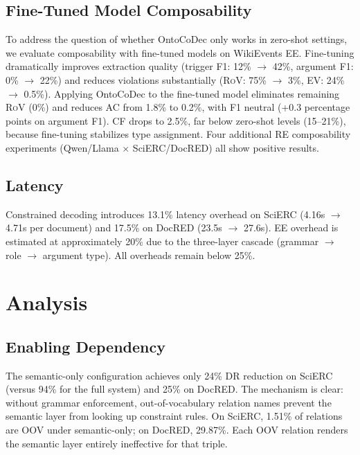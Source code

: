 \documentclass[11pt,a4paper]{article}
\newcommand{\ours}{OntoCoDec}
\newcommand{\drsym}{\textsc{DR}}
\newcommand{\cfsym}{\textsc{CF}}
\newcommand{\evsym}{\textsc{EV}}
\newcommand{\rovsym}{\textsc{RoV}}
\newcommand{\acsym}{\textsc{AC}}
\begin{document}
\subsection{Fine-Tuned Model Composability}

To address the question of whether \ours{} only works in zero-shot settings, we evaluate composability with fine-tuned models on WikiEvents EE. Fine-tuning dramatically improves extraction quality (trigger F1: 12\% $\to$ 42\%, argument F1: 0\% $\to$ 22\%) and reduces violations substantially (\rovsym{}: 75\% $\to$ 3\%, \evsym{}: 24\% $\to$ 0.5\%). Applying \ours{} to the fine-tuned model eliminates remaining \rovsym{} (0\%) and reduces \acsym{} from 1.8\% to 0.2\%, with F1 neutral (+0.3 percentage points on argument F1). \cfsym{} drops to 2.5\%, far below zero-shot levels (15--21\%), because fine-tuning stabilizes type assignment. Four additional RE composability experiments (Qwen/Llama $\times$ SciERC/DocRED) all show positive results.

\subsection{Latency}

Constrained decoding introduces 13.1\% latency overhead on SciERC (4.16s $\to$ 4.71s per document) and 17.5\% on DocRED (23.5s $\to$ 27.6s). EE overhead is estimated at approximately 20\% due to the three-layer cascade (grammar $\to$ role $\to$ argument type). All overheads remain below 25\%.

\section{Analysis}
\label{sec:analysis}

\subsection{Enabling Dependency}
\label{sec:analysis-enabling}

The semantic-only configuration achieves only 24\% \drsym{} reduction on SciERC (versus 94\% for the full system) and 25\% on DocRED. The mechanism is clear: without grammar enforcement, out-of-vocabulary relation names prevent the semantic layer from looking up constraint rules. On SciERC, 1.51\% of relations are OOV under semantic-only; on DocRED, 29.87\%. Each OOV relation renders the semantic layer entirely ineffective for that triple.
\end{document}
